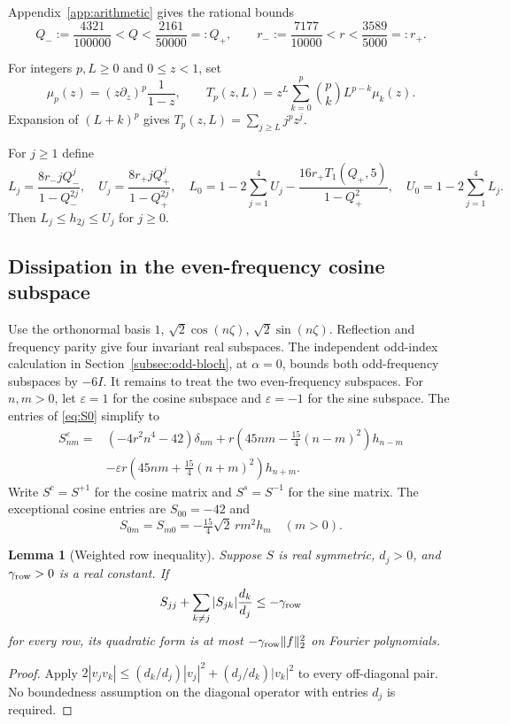 \documentclass[a4paper,11pt]{article}
\numberwithin{equation}{section}
\newtheorem{lemma}[theorem]{Lemma}
\theoremstyle{definition}
\theoremstyle{remark}
\newcommand{\norm}[1]{\lVert#1\rVert}
\begin{document}
Appendix~\ref{app:arithmetic} gives the rational bounds
\begin{equation}\label{eq:endpoints}
 Q_-:=\frac{4321}{100000}<Q<\frac{2161}{50000}=:Q_+,
 \qquad r_-:=\frac{7177}{10000}<r<\frac{3589}{5000}=:r_+.
\end{equation}


For integers $p,L\ge0$ and $0\le z<1$, set
\begin{equation}\label{eq:moments}
 \mu_p(z)=(z\partial_z)^p\frac1{1-z},\qquad
 T_p(z,L)=z^L\sum_{k=0}^p\binom pk L^{p-k}\mu_k(z).
\end{equation}
Expansion of $(L+k)^p$ gives $T_p(z,L)=\sum_{j\ge L}j^pz^j$.

For $j\ge1$ define
\begin{equation}\label{eq:L-U}
 L_j=\frac{8r_-jQ_-^j}{1-Q_-^{2j}},\quad
 U_j=\frac{8r_+jQ_+^j}{1-Q_+^{2j}},\quad
 L_0=1-2\sum_{j=1}^4U_j-\frac{16r_+T_1(Q_+,5)}{1-Q_+^2},\quad
 U_0=1-2\sum_{j=1}^4L_j.
\end{equation}
Then $L_j\le h_{2j}\le U_j$ for $j\ge0$.

\subsection{Dissipation in the even-frequency cosine subspace}
Use the orthonormal basis $1$, $\sqrt2\cos(n\zeta)$, $\sqrt2\sin(n\zeta)$. Reflection and frequency parity give four invariant real subspaces. The independent odd-index calculation in Section~\ref{subsec:odd-bloch}, at $\alpha=0$, bounds both odd-frequency subspaces by $-6I$. It remains to treat the two even-frequency subspaces. For $n,m>0$, let $\varepsilon=1$ for the cosine subspace and $\varepsilon=-1$ for the sine subspace. The entries of \eqref{eq:S0} simplify to
\begin{align}
 S^\varepsilon_{nm}={}&(-4r^2n^4-42)\delta_{nm}
 +r\left(45nm-\tfrac{15}{4}(n-m)^2\right)h_{n-m}\nonumber\\
 &-\varepsilon r\left(45nm+\tfrac{15}{4}(n+m)^2\right)h_{n+m}.\label{eq:entries}
\end{align}
Write $S^c=S^{+1}$ for the cosine matrix and $S^s=S^{-1}$ for the sine matrix. The exceptional cosine entries are $S_{00}=-42$ and
\begin{equation}\label{eq:zero}
 S_{0m}=S_{m0}=-\tfrac{15}{4}\sqrt2\,r m^2h_m\quad(m>0).
\end{equation}


\begin{lemma}[Weighted row inequality]\label{lem:row}
Suppose $S$ is real symmetric, $d_j>0$, and $\gamma_{\rm row}>0$ is a real constant. If
\[
 S_{jj}+\sum_{k\ne j}|S_{jk}|\frac{d_k}{d_j}\le-\gamma_{\rm row}
\]
for every row, its quadratic form is at most $-\gamma_{\rm row}\norm f_2^2$ on Fourier polynomials.
\end{lemma}
\begin{proof}
Apply $2|v_jv_k|\le(d_k/d_j)|v_j|^2+(d_j/d_k)|v_k|^2$ to every off-diagonal pair. No boundedness assumption on the diagonal operator with entries $d_j$ is required.
\end{proof}
\end{document}
